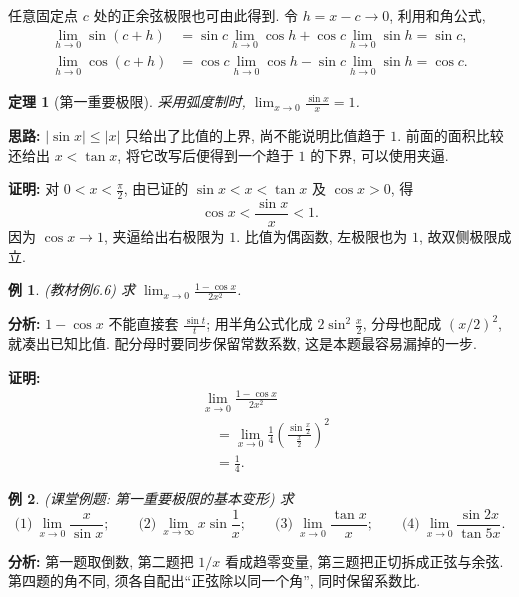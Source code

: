 \documentclass[UTF8,openany]{ctexbook}
\theoremstyle{chinesetextbook}
\newtheorem{example}{例}[section]
\newtheorem{theorem}{定理}[section]
\newenvironment{cnproof}{\par\indent\textbf{证明:} \ignorespaces}{\par}
\begin{document}
任意固定点 $c$ 处的正余弦极限也可由此得到. 令 $h=x-c\to0$, 利用和角公式,
\[
\begin{aligned}
\lim_{h\to0}\sin(c+h)
&=\sin c\lim_{h\to0}\cos h+\cos c\lim_{h\to0}\sin h=\sin c,\\
\lim_{h\to0}\cos(c+h)
&=\cos c\lim_{h\to0}\cos h-\sin c\lim_{h\to0}\sin h=\cos c.
\end{aligned}
\]
\begin{theorem}[第一重要极限]
采用弧度制时, $\displaystyle \lim_{x\to0}\frac{\sin x}{x}=1$.
\end{theorem}
\par\indent\textbf{思路:} $|\sin x|\le|x|$ 只给出了比值的上界, 尚不能说明比值趋于 $1$. 前面的面积比较还给出 $x<\tan x$, 将它改写后便得到一个趋于 $1$ 的下界, 可以使用夹逼.
\begin{cnproof}
对 $\displaystyle0<x<\frac\pi2$, 由已证的 $\sin x<x<\tan x$ 及 $\cos x>0$, 得
\[
\cos x<\frac{\sin x}{x}<1.
\]
因为 $\cos x\to1$, 夹逼给出右极限为 $1$. 比值为偶函数, 左极限也为 $1$, 故双侧极限成立.
\end{cnproof}
\begin{example}
(教材例6.6) 求 $\displaystyle \lim_{x\to0}\frac{1-\cos x}{2x^2}$.
\end{example}
\par\indent\textbf{分析:} $1-\cos x$ 不能直接套 $\displaystyle\frac{\sin t}t$; 用半角公式化成 $\displaystyle2\sin^2\frac x2$, 分母也配成 $(x/2)^2$, 就凑出已知比值. 配分母时要同步保留常数系数, 这是本题最容易漏掉的一步.
\begin{cnproof}
\[
\begin{aligned}
&\lim_{x\to0}\frac{1-\cos x}{2x^2}\\
&\quad=\lim_{x\to0}\frac14\left(\frac{\sin\frac x2}{\frac x2}\right)^2\\
&\quad=\frac14.
\end{aligned}
\]
\end{cnproof}
\begin{example}
(课堂例题: 第一重要极限的基本变形) 求
\[
\text{(1)}\ \lim_{x\to0}\frac{x}{\sin x};\qquad
\text{(2)}\ \lim_{x\to\infty}x\sin\frac1x;\qquad
\text{(3)}\ \lim_{x\to0}\frac{\tan x}{x};\qquad
\text{(4)}\ \lim_{x\to0}\frac{\sin2x}{\tan5x}.
\]
\end{example}
\par\indent\textbf{分析:} 第一题取倒数, 第二题把 $1/x$ 看成趋零变量, 第三题把正切拆成正弦与余弦. 第四题的角不同, 须各自配出“正弦除以同一个角”, 同时保留系数比.
\end{document}

